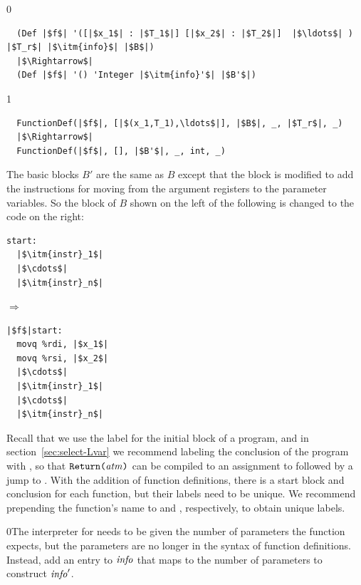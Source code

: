 \documentclass[7x10]{TimesAPriori_MIT}%
\def\racketEd{0}
\def\pythonEd{1}
\def\edition{1}
\newcommand{\racket}[1]{{\if\edition\racketEd{#1}\fi}}
\newcommand{\pythonColor}[0]{}
\numberwithin{theorem}{chapter}
\numberwithin{definition}{chapter}
\numberwithin{equation}{chapter}
\begin{document}
{\if\edition\racketEd
\begin{lstlisting}
  (Def |$f$| '([|$x_1$| : |$T_1$|] [|$x_2$| : |$T_2$|]  |$\ldots$| ) |$T_r$| |$\itm{info}$| |$B$|)
  |$\Rightarrow$|
  (Def |$f$| '() 'Integer |$\itm{info}'$| |$B'$|)
\end{lstlisting}
\fi}
{\if\edition\pythonEd\pythonColor
\begin{lstlisting}
  FunctionDef(|$f$|, [|$(x_1,T_1),\ldots$|], |$B$|, _, |$T_r$|, _)
  |$\Rightarrow$|
  FunctionDef(|$f$|, [], |$B'$|, _, int, _)
\end{lstlisting}
\fi}
The basic blocks $B'$ are the same as $B$ except that the
 block is modified to add the instructions for moving from
the argument registers to the parameter variables. So the 
block of $B$ shown on the left of the following is changed to the code
on the right:
\begin{center}
\begin{minipage}{0.3\textwidth}
\begin{lstlisting}
start:
  |$\itm{instr}_1$|
  |$\cdots$|
  |$\itm{instr}_n$|
\end{lstlisting}
\end{minipage}
$\Rightarrow$
\begin{minipage}{0.3\textwidth}
\begin{lstlisting}
|$f$|start:
  movq %rdi, |$x_1$|
  movq %rsi, |$x_2$|
  |$\cdots$|
  |$\itm{instr}_1$|
  |$\cdots$|
  |$\itm{instr}_n$|
\end{lstlisting}
\end{minipage}
\end{center}
Recall that we use the label  for the initial block of a
program, and in section~\ref{sec:select-Lvar} we recommend labeling
the conclusion of the program with , so that
$\texttt{Return}\texttt{(} \mathit{atm} \texttt{)}$ can be compiled to an assignment to  followed
by a jump to . With the addition of function
definitions, there is a start block and conclusion for each function,
but their labels need to be unique. We recommend prepending the
function's name to  and , respectively,
to obtain unique labels.

\racket{The interpreter for \LangXIndCall{} needs to be given the
  number of parameters the function expects, but the parameters are no
  longer in the syntax of function definitions. Instead, add an entry
  to $\mathit{info}$ that maps \code{num-params} to the number of
  parameters to construct $\mathit{info}'$.}
\end{document}
